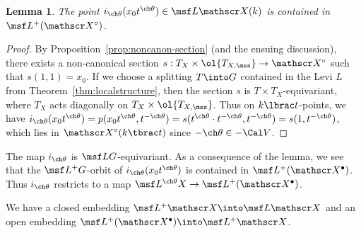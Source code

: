 \documentclass[final]{amsart}
\newtheorem{lem}[subsubsection]{Lemma}
\theoremstyle{remark}
\theoremstyle{definition}
\numberwithin{equation}{section}
\begin{document}
\begin{lem} \label{lem:itheta-lands-open}
The point $i_{\ch\theta}(x_0 t^{\ch\theta}) \in \msf L \mathscr X(k)$ is contained in 
$\msf L^+( \mathscr X^\circ )$. 
\end{lem}
\begin{proof}
By Proposition~\ref{prop:noncanon-section} (and the ensuing discussion), 
there exists a non-canonical section $s: T_X \times \ol{T_{X,\mss}} \to \mathscr X^\circ$
such that $s(1,1) = x_0$. 
If we choose a splitting $T \into G$ contained in the Levi $L$ from Theorem~\ref{thm:localstructure}, then the section $s$ is $T \times T_X$-equivariant, where 
$T_X$ acts diagonally on $T_X \times \ol{T_{X,\mss}}$. 
Thus on $k\lbrac t$-points, 
we have $i_{\ch\theta}(x_0 t^{\ch\theta}) = p(x_0 t^{\ch\theta}, t^{-\ch\theta})
= s(t^{\ch\theta}\cdot t^{-\ch\theta}, t^{-\ch\theta}) = s(1, t^{-\ch\theta})$,
which lies in $\mathscr X^\circ (k \tbrac t)$
since $-\ch\theta\in -\Cal V$. 
\end{proof}

The map $i_{\ch\theta}$ is $\msf L G$-equivariant. 
As a consequence of the lemma, we see that the $\msf L^+G$-orbit of
$i_{\ch\theta}(x_0 t^{\ch\theta})$ is contained in $\msf L^+(\mathscr X^\bullet)$. 
Thus
$i_{\ch\theta}$ restricts to a map $\msf L^{\ch\theta}X \to \msf L^+(\mathscr X^\bullet)$. 

We have a closed embedding $\msf L^+ \mathscr X \into \msf L \mathscr X$
and an open embedding $\msf L^+(\mathscr X^\bullet) \into \msf L^+\mathscr X$. 
\end{document}
